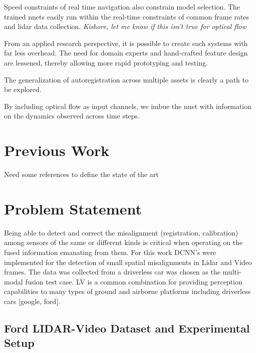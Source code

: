 \documentclass{article}
\begin{document}
Speed constraints of real time navigation also constrain model selection. The trained nnets easily run within the real-time constraints of common frame rates and lidar data collection. \emph{Kishore, let me know if this isn't true for optical flow}

From an applied research perspective, it is possible to create such systems with far less overhead. The need for domain experts and hand-crafted feature design are lessened, thereby allowing more rapid prototyping and testing. 

The generalization of autoregistration across multiple assets is clearly a path to be explored. 

By including optical flow as input channels, we imbue the nnet with information on the dynamics observed across time steps. 


\section{Previous Work} %
\label{sec:previous_work}
Need some references to define the state of the art 



\section{Problem Statement} %
\label{sec:problem_statement}

Being able to detect and correct the misalignment (registration, calibration) among sensors of the same or different kinds is critical when operating on the fused information emanating from them. For this work DCNN's were implemented for the detection of small spatial misalignments in Lidar and Video frames. The data was collected from a driverless car was chosen as the multi-modal fusion test case. LV is a common combination for providing perception capabilities to many types of ground and airborne platforms including driverless cars [google, ford]. 

\subsection{Ford LIDAR-Video Dataset and Experimental Setup} %
\label{sub:ford_lidar_video_dataset_and_experimental_setup}
\end{document}
